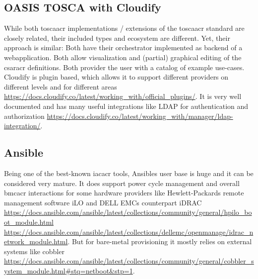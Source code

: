 \subsection{OASIS TOSCA with Cloudify}
While both \gls{toscaacr} implementations / extensions of the \gls{toscaacr} standard are closely related, their included types and ecosystem are different. Yet, their approach is similar: Both have their orchestrator implemented as backend of a webapplication. Both allow visualization and (partial) graphical editing of the \gls{csaracr} definitions. Both provider the user with a catalog of example use-cases.
\newline
Cloudify is plugin based, which allows it to support different providers on different levels and for different areas \url{https://docs.cloudify.co/latest/working_with/official_plugins/}. It is very well documented and has many useful integrations like LDAP for authentication and authorization \url{https://docs.cloudify.co/latest/working_with/manager/ldap-integration/}.

\subsection{Ansible}
Being one of the best-known \gls{iacacr} tools, Ansibles user base is huge and it can be considered very mature. It does support power cycle management and overall \gls{bmcacr} interactions for some hardware providers like Hewlett-Packards remote management software iLO and DELL EMCs counterpart iDRAC \url{https://docs.ansible.com/ansible/latest/collections/community/general/hpilo_boot_module.html} \url{https://docs.ansible.com/ansible/latest/collections/dellemc/openmanage/idrac_network_module.html}. But for  bare-metal provisioning it mostly relies on external systems like cobbler \url{https://docs.ansible.com/ansible/latest/collections/community/general/cobbler_system_module.html#stq=netboot&stp=1}.

